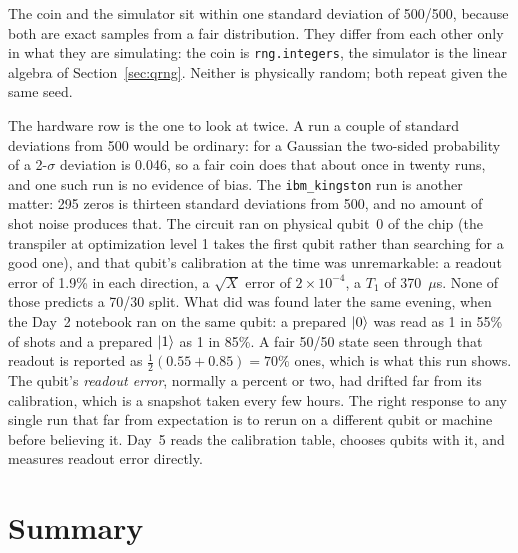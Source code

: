 \documentclass[11pt]{article}
\newcommand{\code}[1]{\texttt{#1}}
\begin{document}
The coin and the simulator sit within one standard deviation of 500/500, because both are exact samples from a fair distribution. They differ from each other only in what they are simulating: the coin is \code{rng.integers}, the simulator is the linear algebra of Section~\ref{sec:qrng}. Neither is physically random; both repeat given the same seed.

The hardware row is the one to look at twice. A run a couple of standard deviations from 500 would be ordinary: for a Gaussian the two-sided probability of a 2-$\sigma$ deviation is 0.046, so a fair coin does that about once in twenty runs, and one such run is no evidence of bias. The \code{ibm\_kingston} run is another matter: 295 zeros is thirteen standard deviations from 500, and no amount of shot noise produces that. The circuit ran on physical qubit~0 of the chip (the transpiler at optimization level 1 takes the first qubit rather than searching for a good one), and that qubit's calibration at the time was unremarkable: a readout error of 1.9\% in each direction, a $\sqrt X$ error of $2\times10^{-4}$, a $T_1$ of 370~$\mu$s. None of those predicts a 70/30 split. What did was found later the same evening, when the Day~2 notebook ran on the same qubit: a prepared $\ket{0}$ was read as 1 in 55\% of shots and a prepared $\ket{1}$ as 1 in 85\%. A fair 50/50 state seen through that readout is reported as $\tfrac12(0.55 + 0.85) = 70\%$ ones, which is what this run shows. The qubit's \emph{readout error}, normally a percent or two, had drifted far from its calibration, which is a snapshot taken every few hours. The right response to any single run that far from expectation is to rerun on a different qubit or machine before believing it. Day~5 reads the calibration table, chooses qubits with it, and measures readout error directly.

\section{Summary}
\end{document}
